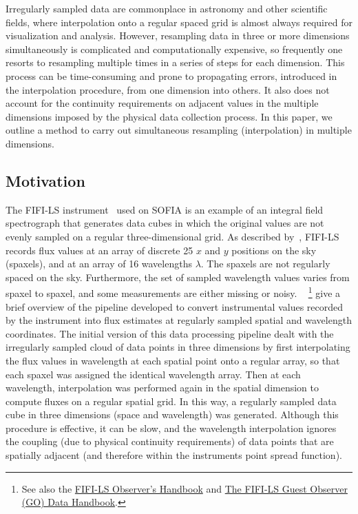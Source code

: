 Irregularly sampled data are commonplace in astronomy and other scientific
fields, where interpolation onto a regular spaced grid is almost always required
for visualization and analysis.
However, resampling data in three or more dimensions simultaneously is
complicated and computationally expensive, so frequently one resorts to
resampling multiple times in a series of steps for each dimension.
This process can be time-consuming and prone to propagating errors, introduced
in the interpolation procedure, from one dimension into others.
It also does not account for the continuity requirements on adjacent values
in the multiple dimensions imposed by the physical data collection process.
In this paper, we outline a method to carry out simultaneous resampling
(interpolation) in multiple dimensions.

\subsection{Motivation}\label{subsec:motivation}

The FIFI-LS instrument~\citep{Colditz18, Fischer18} used on SOFIA is an example
of an integral field spectrograph that generates data cubes in which the
original values are not evenly sampled on a regular three-dimensional grid.
As described by~\citet{Fischer18}, FIFI-LS records flux values at an array of
discrete 25 $x$ and $y$ positions on the sky (spaxels), and at an array of
16 wavelengths $\lambda$.
The spaxels are not regularly spaced on the sky.
Furthermore, the set of sampled wavelength values varies from spaxel to spaxel,
and some measurements are either missing or noisy.
~\citet{Vacca20}
\footnote{See also the \href{https://www.sofia.usra.edu/sites/default/files/USpot_DCS_DPS/Documents/FIFI-LS_GO_Handbook_RevC.pdf}
{FIFI-LS Observer's Handbook} and
\href{https://www.sofia.usra.edu/sites/default/files/USpot_DCS_DPS/Documents/FIFI-LSDataHandbookRevE.pdf}
{The FIFI-LS Guest Observer (GO) Data Handbook}.}
give a brief overview of the pipeline developed to convert instrumental values
recorded by the instrument into flux estimates at regularly sampled spatial and
wavelength coordinates.
The initial version of this data processing pipeline dealt with the irregularly
sampled cloud of data points in three dimensions by first interpolating the
flux values in wavelength at each spatial point onto a regular array, so that
each spaxel was assigned the identical wavelength array.
Then at each wavelength, interpolation was performed again in the spatial
dimension to compute fluxes on a regular spatial grid.
In this way, a regularly sampled data cube in three dimensions (space and
wavelength) was generated.
Although this procedure is effective, it can be slow, and the wavelength
interpolation ignores the coupling (due to physical continuity requirements) of
data points that are spatially adjacent (and therefore within the instruments
point spread function).


